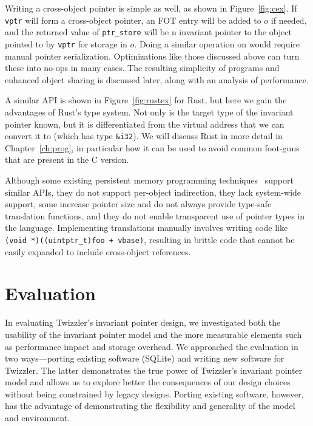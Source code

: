 Writing a cross-object pointer is simple as well, as shown in Figure~\ref{fig:cex}.
If \texttt{vptr} will form a cross-object pointer, an FOT entry will be added to $o$ if
needed, and the returned value of \texttt{ptr\_store} will be n invariant
pointer to the object pointed to by \texttt{vptr} for storage in $o$. Doing a
similar operation on \unix would require manual pointer serialization.
Optimizations like those discussed above can
turn these into no-ops in many cases. The resulting simplicity of programs and
enhanced object sharing is
discussed later, along with an analysis of performance.

A similar API is shown in Figure~\ref{fig:rustex} for Rust, but here we gain the advantages of Rust's type system. Not
only is the target type of the invariant pointer known, but it is differentiated from the virtual address that we can
convert it to (which has type \texttt{\&i32}). We will discuss Rust in more detail in Chapter~\ref{ch:prog}, in
particular how it can be used to avoid common foot-guns that are present in the C version.

Although some existing persistent memory programming
techniques~\cite{libpmem,Chen:micro17,wang:micro17} support similar
APIs, they do not support per-object indirection, they lack system-wide support,
some increase pointer size and do not always provide
type-safe translation functions, and they do not enable transparent use of pointer
types in the language. Implementing translations manually involves writing code
like
\texttt{(void *)((uintptr\_t)foo + vbase)}, resulting in brittle code that
cannot be easily expanded to include cross-object references.


\section{Evaluation}

In evaluating Twizzler's invariant pointer design, we investigated both the
usability of the invariant pointer model and the more measurable elements such as performance impact
and storage overhead. We approached the evaluation in two ways---porting existing software
(SQLite) and writing new software for Twizzler. The latter demonstrates the true power of
Twizzler's invariant pointer model and allows us to explore better the consequences of our design
choices without being constrained by legacy designs. Porting existing software, however, has the
advantage of demonstrating the flexibility and generality of the model and environment.

